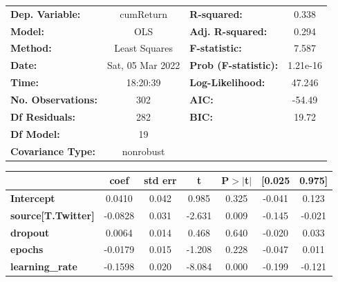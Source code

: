 \begin{center}
\begin{tabular}{lclc}
\toprule
\textbf{Dep. Variable:}                   &    cumReturn     & \textbf{  R-squared:         } &     0.338   \\
\textbf{Model:}                           &       OLS        & \textbf{  Adj. R-squared:    } &     0.294   \\
\textbf{Method:}                          &  Least Squares   & \textbf{  F-statistic:       } &     7.587   \\
\textbf{Date:}                            & Sat, 05 Mar 2022 & \textbf{  Prob (F-statistic):} &  1.21e-16   \\
\textbf{Time:}                            &     18:20:39     & \textbf{  Log-Likelihood:    } &    47.246   \\
\textbf{No. Observations:}                &         302      & \textbf{  AIC:               } &    -54.49   \\
\textbf{Df Residuals:}                    &         282      & \textbf{  BIC:               } &     19.72   \\
\textbf{Df Model:}                        &          19      & \textbf{                     } &             \\
\textbf{Covariance Type:}                 &    nonrobust     & \textbf{                     } &             \\
\bottomrule
\end{tabular}
\begin{tabular}{lcccccc}
                                          & \textbf{coef} & \textbf{std err} & \textbf{t} & \textbf{P$> |$t$|$} & \textbf{[0.025} & \textbf{0.975]}  \\
\midrule
\textbf{Intercept}                        &       0.0410  &        0.042     &     0.985  &         0.325        &       -0.041    &        0.123     \\
\textbf{source[T.Twitter]}                &      -0.0828  &        0.031     &    -2.631  &         0.009        &       -0.145    &       -0.021     \\
\textbf{dropout}                          &       0.0064  &        0.014     &     0.468  &         0.640        &       -0.020    &        0.033     \\
\textbf{epochs}                           &      -0.0179  &        0.015     &    -1.208  &         0.228        &       -0.047    &        0.011     \\
\textbf{learning\_rate}                   &      -0.1598  &        0.020     &    -8.084  &         0.000        &       -0.199    &       -0.121     \\

\end{tabular}
\end{center}
